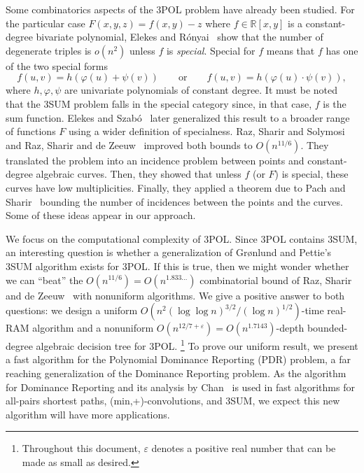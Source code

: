 Some combinatorics aspects of the 3POL problem have already been studied.
%
For the particular case $F(x,y,z) = f(x,y) - z$ where $f \in \mathbb{R}[x,y]$
is a constant-degree bivariate polynomial, Elekes and Rónyai~\cite{ER00} show
that the number of degenerate triples is $o(n^2)$ unless $f$ is
\emph{special}. Special for $f$ means that $f$ has one of the two special forms
\begin{displaymath}
f(u,v)=h(\varphi(u)+\psi(v))
\qquad
\text{or}
\qquad
f(u,v)=h(\varphi(u)\cdot\psi(v)),
\end{displaymath}
where $h,\varphi,\psi$ are univariate polynomials of constant degree.
It must be noted that the 3SUM problem falls in the special category since, in
that case, \( f \) is the sum function.
%
Elekes and Szabó~\cite{ES12} later generalized this result to a broader range
of functions $F$ using a wider definition of specialness.
%
Raz, Sharir and Solymosi~\cite{RSS14} and Raz, Sharir and de Zeeuw~\cite{RSZ15}
improved both bounds to $O(n^{11/6})$.
%
They translated the problem into an incidence problem between points and
constant-degree algebraic curves. Then, they showed that unless $f$ (or $F$) is
special, these curves have low multiplicities. Finally, they applied a theorem
due to Pach and Sharir~\cite{PS98} bounding the number of incidences between
the points and the curves. Some of these ideas appear in our approach.

We focus on the computational complexity of 3POL\@. Since 3POL contains 3SUM,
an interesting question is whether a generalization of Gr\o nlund and Pettie's
3SUM algorithm exists for 3POL\@. If this is true, then we might wonder whether
we can ``beat'' the $O(n^{11/6}) = O(n^{1.833\ldots})$ combinatorial bound of Raz,
Sharir and de Zeeuw~\cite{RSZ15} with nonuniform algorithms. We give a positive
answer to both questions: we design
a uniform
$O(n^2 {(\log \log n)}^{3/2} / {(\log n)}^{1/2})$-time
real-RAM algorithm
and
a nonuniform
$O(n^{12/7+\varepsilon}) = O(n^{1.7143})$-depth
bounded-degree algebraic decision tree
for 3POL\@.%
\footnote{Throughout this document, $\varepsilon$ denotes a positive real
number that can be made as small as desired.}
To prove our uniform result, we present a fast algorithm for the Polynomial
Dominance Reporting (PDR) problem, a far reaching generalization of the
Dominance Reporting problem. As the algorithm for Dominance Reporting and its
analysis by Chan~\cite{Cha08} is used in fast algorithms for all-pairs shortest
paths, (min,+)-convolutions, and 3SUM, we expect this new algorithm will have
more applications.

